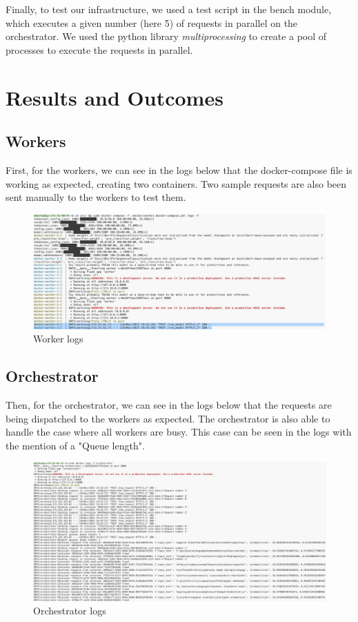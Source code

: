 \documentclass[letterpaper,headings=standardclasses,parskip=half]{scrartcl}
\begin{document}
Finally, to test our infrastructure, we used a test script in the bench module, which executes a given number (here 5) of requests in parallel on the orchestrator. We used the python library \emph{multiprocessing} to create a pool of processes to execute the requests in parallel.

\section{Results and Outcomes}

\subsection{Workers}

First, for the workers, we can see in the logs below that the docker-compose file is working as expected, creating two containers. Two sample requests are also been sent manually to the workers to test them.

\begin{figure}[H]
    \centering
    \includegraphics[width=\textwidth]{images/worker.png}
    \caption{Worker logs}
    \label{fig:worker}
\end{figure}

\subsection{Orchestrator}

Then, for the orchestrator, we can see in the logs below that the requests are being dispatched to the workers as expected. The orchestrator is also able to handle the case where all workers are busy. This case can be seen in the logs with the mention of a "Queue length".

\begin{figure}[H]
    \centering
    \includegraphics[width=\textwidth]{images/orchestrator.png}
    \caption{Orchestrator logs}
    \label{fig:orchestrator}
\end{figure}
\end{document}

